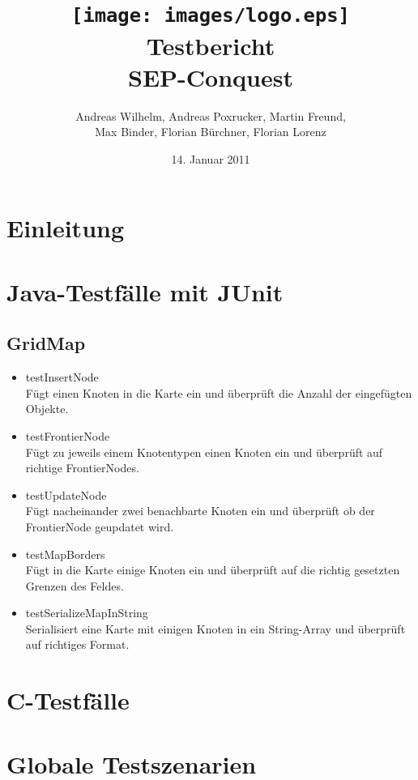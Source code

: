 \documentclass[10pt,a4paper]{article}
\title{
	\texttt{[image: images/logo.eps]} \\
	\vspace{1cm}
	Testbericht \\
	SEP-Conquest
}
\author{Andreas Wilhelm, Andreas Poxrucker, Martin Freund,\\ Max Binder, Florian B\"urchner, Florian Lorenz}
\let\oldsection\section
\renewcommand{\section}{\newpage \oldsection}
\begin{document}
\date{14. Januar 2011}
	\maketitle
	\newpage
	\tableofcontents	
	\newpage
\section{Einleitung}
\section{Java-Testf\"alle mit JUnit}
	\subsection{GridMap}
	\begin{itemize}
		\item{testInsertNode} \\ F\"ugt einen Knoten in die Karte ein und \"uberpr\"uft die Anzahl der eingef\"ugten Objekte.
		\item{testFrontierNode} \\ F\"ugt zu jeweils einem Knotentypen einen Knoten ein und \"uberpr\"uft auf richtige FrontierNodes.
		\item{testUpdateNode} \\ F\"ugt nacheinander zwei benachbarte Knoten ein und \"uberpr\"uft ob der FrontierNode geupdatet wird.
		\item{testMapBorders} \\ F\"ugt in die Karte einige Knoten ein und \"uberpr\"uft auf die richtig gesetzten Grenzen des Feldes.
		\item{testSerializeMapInString} \\ Serialisiert eine Karte mit einigen Knoten in ein String-Array und \"uberpr\"uft auf richtiges Format.
	\end{itemize}
\section{C-Testf\"alle}
\section{Globale Testszenarien}
\end{document}
